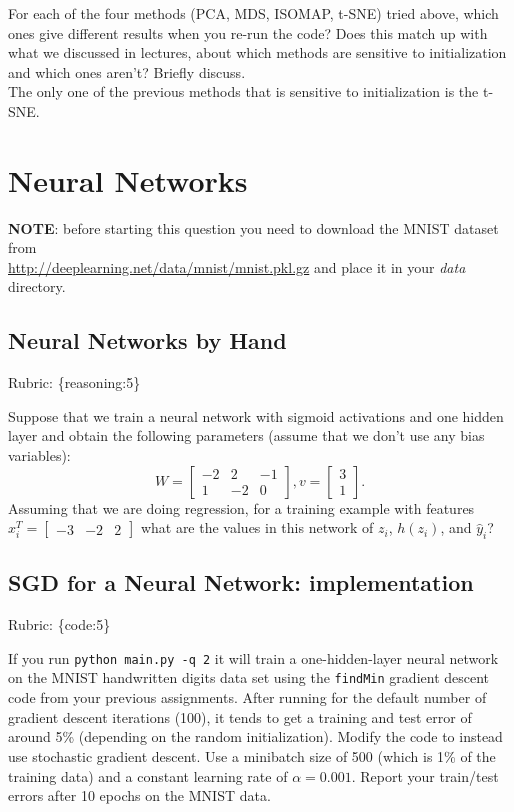 \documentclass{article}
\def\rubric#1{\gre{Rubric: \{#1\}}}{}
\def\blu#1{{\color{blu}#1}}
\def\gre#1{{\color{gre}#1}}
\def\ans#1{{\color{ans}#1}}
\newcommand{\mat}[1]{\begin{bmatrix}#1\end{bmatrix}}
\begin{document}
For each of the four methods (PCA, MDS, ISOMAP, t-SNE) tried above, which ones give different results when you re-run the code? Does this match up with what we discussed in lectures, about which methods are sensitive to initialization and which ones aren't? Briefly discuss. \\
\ans{
    The only one of the previous methods that is sensitive to initialization is the t-SNE.
}


\section{Neural Networks}

\textbf{NOTE}: before starting this question you need to download the MNIST dataset from \\ \url{http://deeplearning.net/data/mnist/mnist.pkl.gz} and place it in your \emph{data} directory.


\subsection{Neural Networks by Hand}
\rubric{reasoning:5}

Suppose that we train a neural network with sigmoid activations and one hidden layer and obtain the following parameters (assume that we don't use any bias variables):
\[
W = \mat{-2 & 2 & -1\\1 & -2 & 0}, v = \mat{3 \\1}.
\]
Assuming that we are doing regression, \blu{for a training example with features $x_i^T = \mat{-3 &-2 & 2}$ what are the values in this network of $z_i$, $h(z_i)$, and $\hat{y}_i$?}

\subsection{SGD for a Neural Network: implementation}
\rubric{code:5}


If you run \texttt{python main.py -q 2} it will train a one-hidden-layer neural network on the MNIST handwritten digits data set using the \texttt{findMin} gradient descent code from your previous assignments. After running for the default number of gradient descent iterations (100), it tends to get a training and test error of around 5\% (depending on the random initialization). 
\blu{Modify the code to instead use stochastic gradient descent. Use a minibatch size of 500 (which is 1\% of the training data) and a constant learning rate of $\alpha=0.001$. Report your train/test errors after 10 epochs on the MNIST data.} 
\ans{
}
\end{document}
